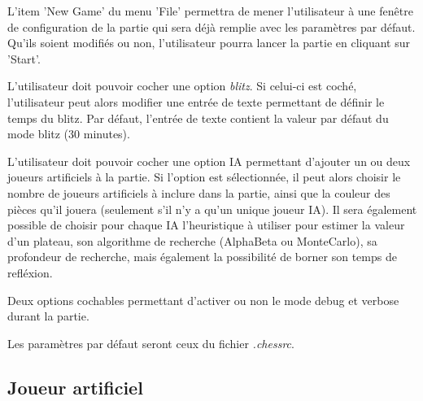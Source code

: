 \documentclass{article}
\begin{document}
\begin{needbox}
    L'item 'New Game' du menu 'File' permettra de mener l'utilisateur à une fenêtre de configuration
    de la partie qui sera déjà remplie avec les paramètres par défaut. Qu'ils soient modifiés ou
    non, l'utilisateur pourra lancer la partie en cliquant sur 'Start'.
    \begin{subneedbox}
        L'utilisateur doit pouvoir cocher une option \textit{blitz}.
        Si celui-ci est coché, l'utilisateur peut alors modifier une entrée
        de texte permettant de définir le temps du blitz. Par défaut, l'entrée de texte
        contient la valeur par défaut du mode blitz (30 minutes).
    \end{subneedbox}
    \begin{subneedbox}
        L'utilisateur doit pouvoir cocher une option IA permettant d'ajouter
        un ou deux joueurs artificiels à la partie. Si l'option est sélectionnée,
        il peut alors choisir le nombre de joueurs artificiels à inclure dans la partie,
        ainsi que la couleur des pièces qu'il jouera (seulement s'il n'y a qu'un unique
        joueur IA).
        Il sera également possible de choisir pour chaque IA l'heuristique à utiliser pour
        estimer la valeur d'un plateau, son algorithme de recherche (AlphaBeta ou MonteCarlo),
        sa profondeur de recherche, mais également la possibilité de borner son temps de refléxion.
    \end{subneedbox}
    \begin{subneedbox}
        Deux options cochables permettant d'activer ou non le mode debug et verbose
        durant la partie.
    \end{subneedbox}
    \begin{subneedbox}
        Les paramètres par défaut seront ceux du fichier \textit{.chessrc}.
    \end{subneedbox}
\end{needbox}

\subsection{Joueur artificiel}

\begin{needbox}
    
\end{needbox}
\end{document}
